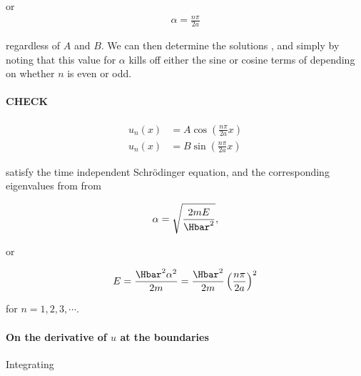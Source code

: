 {or
\begin{equation}\label{eqn:lecture9boundStates:200}
\begin{aligned}
\alpha = \frac{n \pi}{2a}
\end{aligned}
\end{equation}

regardless of \(A\) and \(B\).  We can then determine the solutions , and  simply by noting that this value for \(\alpha\) kills off either the sine or cosine terms of  depending on whether \(n\) is even or odd.

\paragraph{CHECK}

\begin{equation}\label{eqn:lecture9boundStates:220}
\begin{aligned}
u_n(x) &= A \cos \left( \frac{n \pi}{2 a} x \right) \\
u_n(x) &= B \sin \left( \frac{n \pi}{2 a} x \right)
\end{aligned}
\end{equation}

satisfy the time independent Schr\"{o}dinger equation, and the corresponding eigenvalues from from

\begin{equation}\label{eqn:lecture9boundStates:240}
\begin{aligned}
\alpha = \sqrt{\frac{2 m E}{\Hbar^2}},
\end{aligned}
\end{equation}

or

\begin{equation}\label{eqn:lecture9boundStates:260}
\begin{aligned}
E = \frac{\Hbar^2 \alpha^2}{2m} = \frac{\Hbar^2}{2m} \left( \frac{n \pi}{2a} \right)^2
\end{aligned}
\end{equation}

for \(n = 1, 2, 3, \cdots\).

\paragraph{On the derivative of \texorpdfstring{\(u\)}{u} at the boundaries}

Integrating

}
